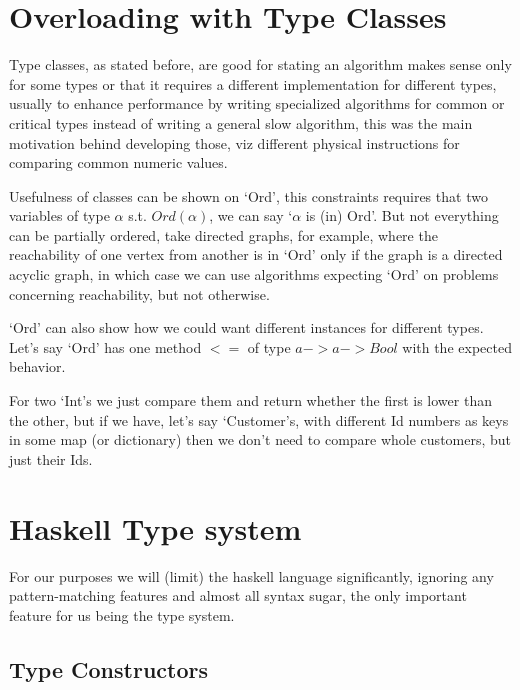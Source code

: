 \section{Overloading with Type Classes}

Type classes, as stated before, are good for stating an algorithm makes sense only for some types or that it requires a different implementation for different types, usually to enhance performance by writing specialized algorithms for common or critical types instead of writing a general slow algorithm, this was the main motivation behind developing those, %
viz different physical instructions for comparing common numeric values.

Usefulness of classes can be shown on `Ord', this constraints requires that two variables of type $\alpha$ s.t. $Ord(\alpha)$, we can say `$\alpha$ is (in) Ord'. But not everything can be partially ordered, take directed graphs, for example, where the reachability of one vertex from another is in `Ord' only if the graph is a directed acyclic graph, in which case we can use algorithms expecting `Ord' on problems concerning reachability, but not otherwise.

`Ord' can also show how we could want different instances for different types. Let's say `Ord' has one method $<=$ of type $a -> a -> Bool$ with the expected behavior. %

For two `Int's we just compare them and return whether the first is lower than the other, but if we have, let's say `Customer's, with different Id numbers as keys in some map (or dictionary) then we don't need to compare whole customers, but just their Ids.



\section{Haskell Type system}

For our purposes we will (limit) the haskell language significantly, ignoring any pattern-matching features and almost all syntax sugar, the only important feature for us being the type system. %

\subsection{Type Constructors}

